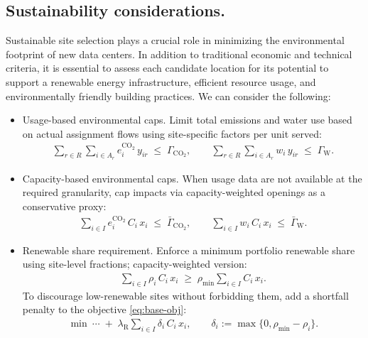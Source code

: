 \documentclass[pdflatex,sn-mathphys-num]{sn-jnl}
\theoremstyle{thmstyleone}
\theoremstyle{thmstyletwo}
\theoremstyle{thmstylethree}
\begin{document}
\subsection{Sustainability considerations.}

Sustainable site selection plays a crucial role in minimizing the environmental footprint of new data centers. In addition to traditional economic and technical criteria, it is essential to assess each candidate location for its potential to support a renewable energy infrastructure, efficient resource usage, and environmentally friendly building practices. We can consider the following:

\begin{itemize}
  \item {Usage-based environmental caps.}
  Limit total emissions and water use based on actual assignment flows using site-specific factors per unit served:
  \begin{align}
    \sum_{r \in R} \sum_{i \in A_r} e_i^{\mathrm{CO_2}} \, y_{ir} \;\le\; \Gamma_{\mathrm{CO_2}}, 
    \qquad
    \sum_{r \in R} \sum_{i \in A_r} w_i \, y_{ir} \;\le\; \Gamma_{\mathrm{W}}. 
    \label{eq:usage-caps}
  \end{align}
 
  \item {Capacity-based environmental caps.}
  When usage data are not available at the required granularity, cap impacts via capacity-weighted openings as a conservative proxy:
  \begin{align}
    \sum_{i \in I} e_i^{\mathrm{CO_2}} \, C_i \, x_i \;\le\; \bar{\Gamma}_{\mathrm{CO_2}},
    \qquad
    \sum_{i \in I} w_i \, C_i \, x_i \;\le\; \bar{\Gamma}_{\mathrm{W}}.
    \label{eq:capacity-caps}
  \end{align}
 

  \item {Renewable share requirement.}
  Enforce a minimum portfolio renewable share using site-level fractions; capacity-weighted version:
  \begin{align}
    \sum_{i \in I} \rho_i \, C_i \, x_i \;\ge\; \rho_{\min} \sum_{i \in I} C_i \, x_i.
    \label{eq:renewable-share}
  \end{align}
  To discourage low-renewable sites without forbidding them, add a shortfall penalty to the objective \eqref{eq:base-obj}:
  \begin{align}
    \min \ \cdots \;+\; 
    \lambda_{\mathrm{R}} \sum_{i \in I} \delta_i \, C_i \, x_i,
    \qquad 
    \delta_i := \max\{0,\rho_{\min}-\rho_i\}.
    \label{eq:renewable-penalty}
  \end{align}
 

\end{itemize}
\end{document}
